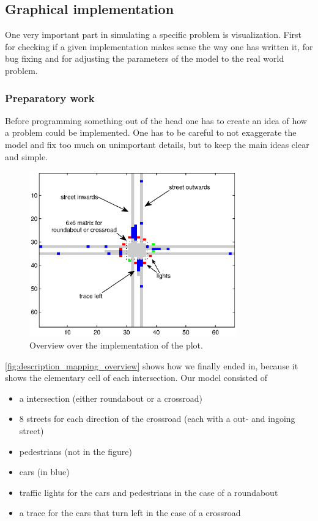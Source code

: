 \subsection{Graphical implementation}

One very important part in simulating a specific problem is visualization. First for checking if a given implementation makes sense the way one has written it, for bug fixing and for adjusting the parameters of the model to the real world problem.

\subsubsection{Preparatory work}
Before programming something out of the head one has to create an idea of how a problem could be implemented. One has to be careful to not exaggerate the model and fix too much on unimportant details, but to keep the main ideas clear and simple. 

\begin{figure}[htb]
	\centering
		\includegraphics[width=0.8\textwidth]{images/description_mapping_overview.eps}
	\caption{Overview over the implementation of the plot.}
	\label{fig:description_mapping_overview}
\end{figure}

\autoref{fig:description_mapping_overview} shows how we finally ended in, because it shows the elementary cell of each intersection. Our model consisted of
\begin{itemize}
	\item a intersection (either roundabout or a crossroad)
	\item 8 streets for each direction of the crossroad (each with a out- and ingoing street)
	\item	pedestrians (not in the figure)
	\item	cars (in blue)
	\item	traffic lights for the cars and pedestrians in the case of a roundabout
	\item a trace for the cars that turn left in the case of a crossroad
\end{itemize}

